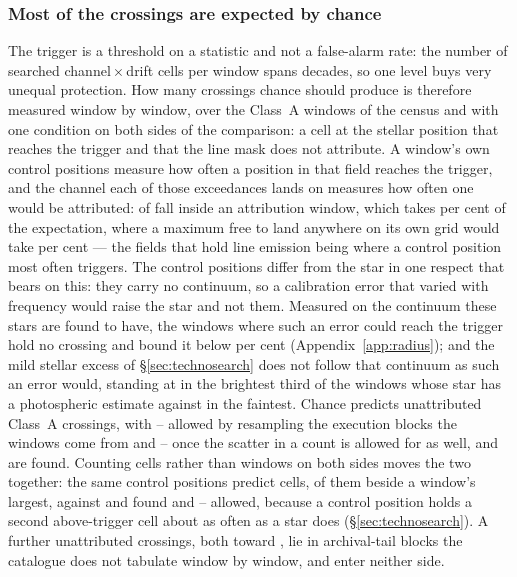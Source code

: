 \subsubsection{Most of the crossings are expected by chance}
\label{sec:trigunif}

The trigger is a threshold on a statistic and not a false-alarm rate: the
number of searched channel\,$\times$\,drift cells per window spans
\TuCellsDecades{} decades, so one level buys very unequal protection. How
many crossings chance should produce is therefore measured window by window,
over the \CeNWin{} Class~A windows of the census and with one condition on
both sides of the comparison: a cell at the stellar position that reaches the
trigger and that the line mask does not attribute. A window's own \NCtrl{}
control positions measure how often a position in that field reaches the
trigger, and the channel each of those exceedances lands on measures how often
one would be attributed: \CeNExcAttr{} of \CeNExc{} fall inside an attribution
window, which takes \CeMaskPct{} per cent of the expectation, where a maximum
free to land anywhere on its own grid would take \CeUnifPct{} per cent ---
the fields that hold line emission being where a control position most often
triggers. The control positions differ from the star in one respect that
bears on this: they carry no continuum, so a calibration error that varied
with frequency would raise the star and not them. Measured on the continuum
these stars are found to have, the windows where such an error could reach
the trigger hold no crossing and bound it below \CxResidHiPct{} per cent
(Appendix~\ref{app:radius}); and the mild stellar excess of
\S\ref{sec:technosearch} does not follow that continuum as such an error
would, standing at \CkRatioContBright{} in the brightest third of the
\CkNContWin{} windows whose star has a photospheric estimate against
\CkRatioContFaint{} in the faintest. Chance predicts \CeExp{} unattributed
Class~A crossings, with \CeLo--\CeHi{} allowed by resampling the execution
blocks the windows come from and \CeCntLo--\CeCntHi{} once the scatter in a
count is allowed for as well, and \CeObs{} are found. Counting cells rather than windows
on both sides moves the two together: the same \CkNCtrlPos{} control positions
predict \CkExp{} cells, \CkExpSec{} of them beside a window's largest, against
\CkNObs{} and \CkNSecUnattr{} found and \CkLo--\CkHi{} allowed, because a
control position holds a second above-trigger cell about as often as a star
does (\S\ref{sec:technosearch}). A further \CeNTailCrossWord{} unattributed
crossings, both toward \CeTailStar, lie in archival-tail blocks the catalogue
does not tabulate window by window, and enter neither side.

